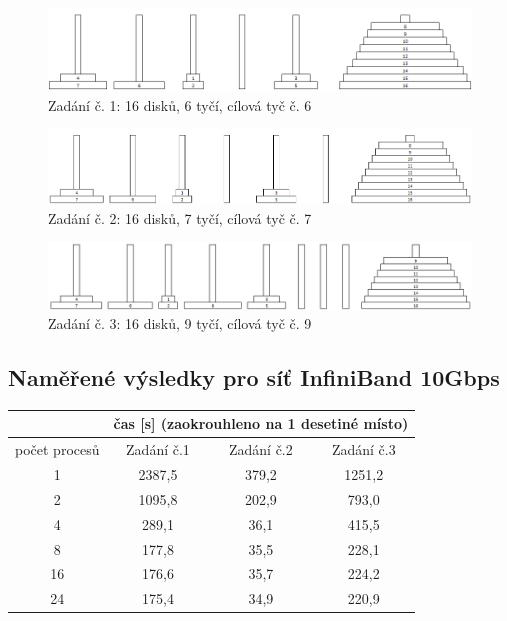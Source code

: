 \documentclass[12pt]{article}
\begin{document}
\begin{figure}[h]
\begin{center}
\includegraphics[width=140mm]{16-6-6.png}
\caption{Zadání č. 1: 16 disků, 6 tyčí, cílová tyč č. 6}
\end{center}
\end{figure}

\begin{figure}[h]
\begin{center}
\includegraphics[width=140mm]{16-7-7.png}
\caption{Zadání č. 2: 16 disků, 7 tyčí, cílová tyč č. 7}
\end{center}
\end{figure}

\begin{figure}[h]
\begin{center}
\includegraphics[width=140mm]{16-9-9.png}
\caption{Zadání č. 3: 16 disků, 9 tyčí, cílová tyč č. 9}
\end{center}
\end{figure}


\subsection{Naměřené výsledky pro síť InfiniBand 10Gbps}
\begin{center}
\begin{tabular}{|c|c|c|c|}
\hline 
 & \multicolumn{3}{c|}{čas [s] (zaokrouhleno na 1 desetiné místo)} \\ 
\hline 
počet procesů & Zadání č.1 & Zadání č.2 & Zadání č.3 \\ 
\hline 
\hline 
1 & 2387,5 & 379,2 & 1251,2 \\ 
\hline 
2 & 1095,8 & 202,9 & 793,0 \\ 
\hline 
4 & 289,1 & 36,1 & 415,5 \\ 
\hline 
8 & 177,8 & 35,5 & 228,1 \\ 
\hline 
16 & 176,6 & 35,7 & 224,2 \\ 
\hline 
24 & 175,4 & 34,9 & 220,9 \\ 
\hline 
\end{tabular} 
\end{center}
\end{document}
